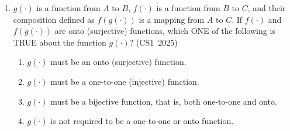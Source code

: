 \begin{enumerate}[label=\thesubsection.\arabic*, ref=\thesubsection.\theenumi]
\vspace{0.2cm}
\solution
Let $F$ be the event that the chosen coin is the fake coin, and $R$ be the event that it is a regular coin. The prior probabilities of selecting each coin are:
\begin{align}
P(F) &= \frac{1}{5} \\
P(R) &= \frac{4}{5}
\end{align}

Let $H_2$ be the event of getting two heads when the chosen coin is tossed twice. 
The probability of getting two heads with a regular coin is:
\begin{align}
P(H_2 \mid R) = \left(\frac{1}{2}\right) \times \left(\frac{1}{2}\right) = \frac{1}{4}
\end{align}

The probability of getting two heads with the fake coin is:
\begin{align}
P(H_2 \mid F) = 1 \times 1 = 1
\end{align}

Using Bayes' theorem:
\begin{align}
P(F \mid H_2) &= \frac{P(F) P(H_2 \mid F)}{P(F) P(H_2 \mid F) + P(R) P(H_2 \mid R)} \\
              &= \frac{\frac{1}{5} \times 1}{\left(\frac{1}{5} \times 1\right) + \left(\frac{4}{5} \times \frac{1}{4}\right)} \\
              &= 0.50
\end{align}

Therefore, the probability that the coin chosen is the fake coin is $0.50$.

\vspace{0.5cm}
\item $g(\cdot)$ is a function from $A$ to $B$, $f(\cdot)$ is a function from $B$ to $C$, and their composition defined as $f(g(\cdot))$ is a mapping from $A$ to $C$. If $f(\cdot)$ and $f(g(\cdot))$ are onto (surjective) functions, which ONE of the following is TRUE about the function $g(\cdot)$?
\hfill (CS1~2025)
\begin{enumerate}
    \item $g(\cdot)$ must be an onto (surjective) function.
    \item $g(\cdot)$ must be a one-to-one (injective) function.
    \item $g(\cdot)$ must be a bijective function, that is, both one-to-one and onto.
    \item $g(\cdot)$ is not required to be a one-to-one or onto function.
\end{enumerate}


\end{enumerate}
